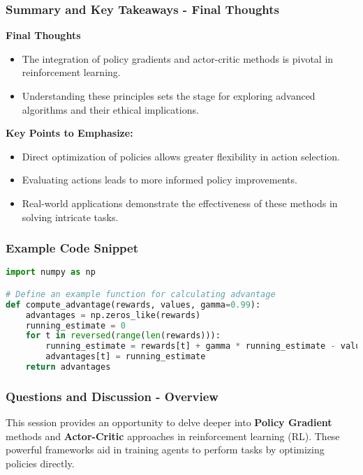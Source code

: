 \documentclass[aspectratio=169]{beamer}
\begin{document}
\begin{frame}[fragile]
    \frametitle{Summary and Key Takeaways - Final Thoughts}
    \textbf{Final Thoughts}
    \begin{itemize}
        \item The integration of policy gradients and actor-critic methods is pivotal in reinforcement learning.
        \item Understanding these principles sets the stage for exploring advanced algorithms and their ethical implications.
    \end{itemize}

    \textbf{Key Points to Emphasize:}
    \begin{itemize}
        \item Direct optimization of policies allows greater flexibility in action selection.
        \item Evaluating actions leads to more informed policy improvements.
        \item Real-world applications demonstrate the effectiveness of these methods in solving intricate tasks.
    \end{itemize}
\end{frame}

\begin{frame}[fragile]
    \frametitle{Example Code Snippet}
    \begin{lstlisting}[language=Python]
import numpy as np

# Define an example function for calculating advantage
def compute_advantage(rewards, values, gamma=0.99):
    advantages = np.zeros_like(rewards)
    running_estimate = 0
    for t in reversed(range(len(rewards))):
        running_estimate = rewards[t] + gamma * running_estimate - values[t]
        advantages[t] = running_estimate
    return advantages
    \end{lstlisting}
\end{frame}

\begin{frame}[fragile]
    \frametitle{Questions and Discussion - Overview}
    This session provides an opportunity to delve deeper into \textbf{Policy Gradient} methods and \textbf{Actor-Critic} approaches in reinforcement learning (RL). These powerful frameworks aid in training agents to perform tasks by optimizing policies directly.
\end{frame}
\end{document}
